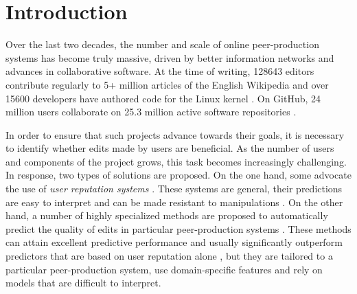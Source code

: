 \section{Introduction}
\label{pps:sec:intro}

Over the last two decades, the number and scale of online peer-production systems has become truly massive, driven by better information networks and advances in collaborative software.
At the time of writing, \num{128643} editors contribute regularly to \num{5}+ million articles of the English Wikipedia \citep{wikipedia2017wikipedians} and over \num{15600} developers have authored code for the Linux kernel \citep{corbet2017linux}.
On GitHub, \num{24} million users collaborate on \num{25.3} million active software repositories \citep{github2017octoverse}.

In order to ensure that such projects advance towards their goals, it is necessary to identify whether edits made by users are beneficial.
As the number of users and components of the project grows, this task becomes increasingly challenging.
In response, two types of solutions are proposed.
On the one hand, some advocate the use of \emph{user reputation systems} \citep{resnick2000reputation, adler2007content}.
These systems are general, their predictions are easy to interpret and can be made resistant to manipulations \citep{dealfaro2013content}.
On the other hand, a number of highly specialized methods are proposed to automatically predict the quality of edits in particular peer-production systems \citep{druck2008learning, wikimedia2015artificial}.
These methods can attain excellent predictive performance \citep{heindorf2016vandalism} and usually significantly outperform predictors that are based on user reputation alone \citep{druck2008learning}, but they are tailored to a particular peer-production system, use domain-specific features and rely on models that are difficult to interpret.

